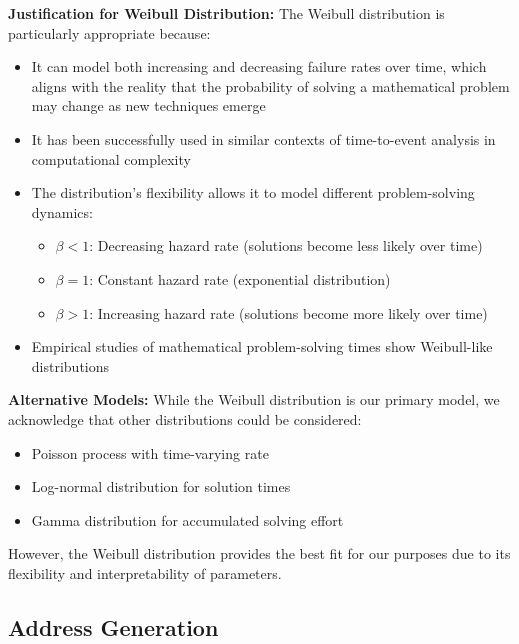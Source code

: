 \documentclass[12pt]{report}
\begin{document}
\textbf{Justification for Weibull Distribution:}
The Weibull distribution is particularly appropriate because:
\begin{itemize}
    \item It can model both increasing and decreasing failure rates over time, which aligns with the reality that the probability of solving a mathematical problem may change as new techniques emerge
    \item It has been successfully used in similar contexts of time-to-event analysis in computational complexity \cite{HisanoSornette2012}
    \item The distribution's flexibility allows it to model different problem-solving dynamics:
    \begin{itemize}
        \item \(\beta < 1\): Decreasing hazard rate (solutions become less likely over time)
        \item \(\beta = 1\): Constant hazard rate (exponential distribution)
        \item \(\beta > 1\): Increasing hazard rate (solutions become more likely over time)
    \end{itemize}
    \item Empirical studies of mathematical problem-solving times show Weibull-like distributions \cite{GhoshAdhikaryPaul2017}
\end{itemize}

\textbf{Alternative Models:}
While the Weibull distribution is our primary model, we acknowledge that other distributions could be considered:
\begin{itemize}
    \item Poisson process with time-varying rate
    \item Log-normal distribution for solution times
    \item Gamma distribution for accumulated solving effort
\end{itemize}
However, the Weibull distribution provides the best fit for our purposes due to its flexibility and interpretability of parameters.

\subsection{Address Generation}
\end{document}
